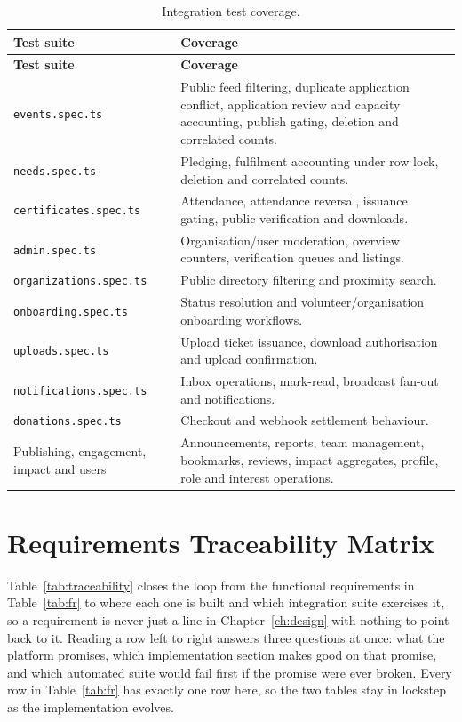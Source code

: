 \begin{longtable}{|p{}|p{}|}
\caption{Integration test coverage.}\label{tab:tests}\\\hline
\textbf{Test suite} & \textbf{Coverage}\\\hline
\endfirsthead
\hline
\textbf{Test suite} & \textbf{Coverage}\\\hline
\endhead
\texttt{events.spec.ts} & Public feed filtering, duplicate application conflict, application review and capacity accounting, publish gating, deletion and correlated counts.\\\hline
\texttt{needs.spec.ts} & Pledging, fulfilment accounting under row lock, deletion and correlated counts.\\\hline
\texttt{certificates.spec.ts} & Attendance, attendance reversal, issuance gating, public verification and downloads.\\\hline
\texttt{admin.spec.ts} & Organisation/user moderation, overview counters, verification queues and listings.\\\hline
\texttt{organizations.spec.ts} & Public directory filtering and proximity search.\\\hline
\texttt{onboarding.spec.ts} & Status resolution and volunteer/organisation onboarding workflows.\\\hline
\texttt{uploads.spec.ts} & Upload ticket issuance, download authorisation and upload confirmation.\\\hline
\texttt{notifications.spec.ts} & Inbox operations, mark-read, broadcast fan-out and notifications.\\\hline
\texttt{donations.spec.ts} & Checkout and webhook settlement behaviour.\\\hline
Publishing, engagement, impact and users & Announcements, reports, team management, bookmarks, reviews, impact aggregates, profile, role and interest operations.\\\hline
\end{longtable}

\clearpage
\section{Requirements Traceability Matrix}
\label{sec:traceability}
Table~\ref{tab:traceability} closes the loop from the functional requirements in Table~\ref{tab:fr} to where each one is built and which integration suite exercises it, so a requirement is never just a line in Chapter~\ref{ch:design} with nothing to point back to it. Reading a row left to right answers three questions at once: what the platform promises, which implementation section makes good on that promise, and which automated suite would fail first if the promise were ever broken. Every row in Table~\ref{tab:fr} has exactly one row here, so the two tables stay in lockstep as the implementation evolves.

